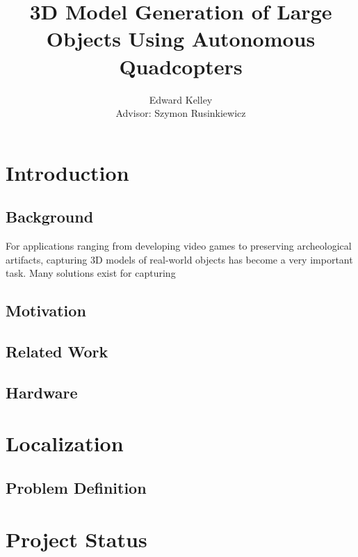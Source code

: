 \documentclass[pageno]{jpaper}
\begin{document}
\title{3D Model Generation of Large Objects Using Autonomous Quadcopters}
\author{Edward Kelley \\
        Advisor: Szymon Rusinkiewicz
}

\date{}
\maketitle

\thispagestyle{empty}


\section{Introduction}

\subsection{Background}

For applications ranging from developing video games to preserving archeological artifacts, capturing 3D models of real-world objects has become a very important task. Many solutions exist for capturing 

\subsection{Motivation}

\subsection{Related Work}

\subsection{Hardware}

\section{Localization}

\subsection{Problem Definition}

\section{Project Status}
\end{document}
